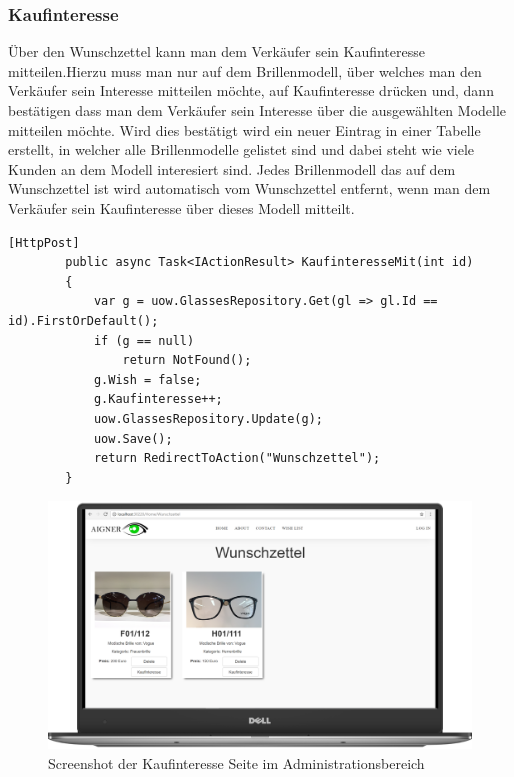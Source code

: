 \subsubsection{Kaufinteresse}
Über den Wunschzettel kann man dem Verkäufer sein Kaufinteresse mitteilen.Hierzu muss man nur auf dem Brillenmodell, über welches man den Verkäufer sein Interesse mitteilen möchte, auf Kaufinteresse drücken und, dann bestätigen dass man dem Verkäufer sein Interesse über die ausgewählten Modelle mitteilen möchte. Wird dies bestätigt wird ein neuer Eintrag in einer Tabelle erstellt, in welcher alle Brillenmodelle gelistet sind und dabei steht wie viele Kunden an dem Modell interesiert sind. Jedes Brillenmodell das auf dem Wunschzettel ist wird automatisch vom Wunschzettel entfernt, wenn man dem Verkäufer sein Kaufinteresse über dieses Modell mitteilt.
\begin{lstlisting}
[HttpPost]
        public async Task<IActionResult> KaufinteresseMit(int id)
        {
            var g = uow.GlassesRepository.Get(gl => gl.Id == id).FirstOrDefault();
            if (g == null)
                return NotFound();
            g.Wish = false;
            g.Kaufinteresse++;
            uow.GlassesRepository.Update(g);
            uow.Save();
            return RedirectToAction("Wunschzettel");
        } 
\end{lstlisting}
\begin{figure}[H]
\begin{center}
	\includegraphics[scale=.2]{images/Wunschzettel.png}
\end{center}
	\caption{Screenshot der Kaufinteresse Seite im Administrationsbereich}
	\label{fig:sample}
\end{figure}
\pagebreak 



